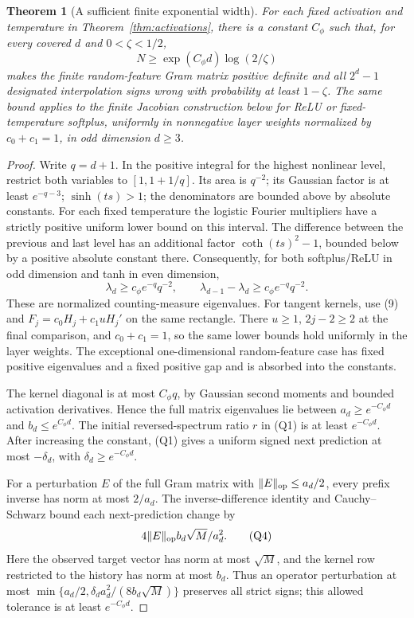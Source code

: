 \documentclass[11pt]{article}
\newtheorem{theorem}{Theorem}\newtheorem{lemma}[theorem]{Lemma}
\begin{document}
\begin{theorem}[A sufficient finite exponential width]
\label{thm:width}
For each fixed activation and temperature in Theorem~\ref{thm:activations}, there is a constant $C_\phi$ such that, for every covered
$d$ and $0<\zeta<1/2$,
\[
                  N\ge\exp(C_\phi d)\log(2/\zeta)             \tag{Q2}
\]
makes the finite random-feature Gram matrix positive definite and all
$2^d-1$ designated interpolation signs wrong with probability at least
$1-\zeta$. The same bound applies to the finite Jacobian construction
below for ReLU or fixed-temperature softplus, uniformly in nonnegative
layer weights normalized by $c_0+c_1=1$, in odd dimension $d\ge3$.
\end{theorem}
\begin{proof}
Write $q=d+1$. In the positive integral for the highest nonlinear level,
restrict both variables to $[1,1+1/q]$. Its area is $q^{-2}$; its
Gaussian factor is at least $e^{-q-3}$; $\sinh(ts)>1$; the denominators
are bounded above by absolute constants. For each fixed temperature
the logistic Fourier multipliers have a strictly positive uniform lower
bound on this interval. The difference between the previous and last
level has an additional factor $\coth(ts)^2-1$, bounded below by a
positive absolute constant there. Consequently, for both softplus/ReLU
in odd dimension and tanh in even dimension,
\[
 \lambda_d\ge c_\phi e^{-q}q^{-2},\qquad
 \lambda_{d-1}-\lambda_d\ge c_\phi e^{-q}q^{-2}.               \tag{Q3}
\]
These are normalized counting-measure eigenvalues. For tangent kernels,
use (9) and $F_j=c_0H_j+c_1uH_j'$ on the same rectangle.
There $u\ge1$, $2j-2\ge2$ at the final comparison, and $c_0+c_1=1$,
so the same lower bounds hold uniformly in the layer weights.
The exceptional one-dimensional random-feature case has fixed positive
eigenvalues and a fixed positive gap and is absorbed into the constants.

The kernel diagonal is at most $C_\phi q$, by Gaussian second moments
and bounded activation derivatives. Hence the full matrix eigenvalues
lie between $a_d\ge e^{-C_\phi d}$ and $b_d\le e^{C_\phi d}$.
The initial reversed-spectrum ratio $r$ in (Q1) is at least
$e^{-C_\phi d}$. After increasing the constant, (Q1) gives a uniform
signed next prediction at most $-\delta_d$, with
$\delta_d\ge e^{-C_\phi d}$.

For a perturbation $E$ of the full Gram matrix with
$\|E\|_{\rm op}\le a_d/2$, every prefix inverse has norm at most
$2/a_d$. The inverse-difference identity and Cauchy--Schwarz bound each
next-prediction change by
\[
          4\|E\|_{\rm op} b_d\sqrt M/a_d^2.                  \tag{Q4}
\]
Here the observed target vector has norm at most $\sqrt M$, and the
kernel row restricted to the history has norm at most $b_d$.
Thus an operator perturbation at most
$\min\{a_d/2,\delta_da_d^2/(8b_d\sqrt M)\}$ preserves all strict signs;
this allowed tolerance is at least $e^{-C_\phi d}$.


\end{proof}
\end{document}
